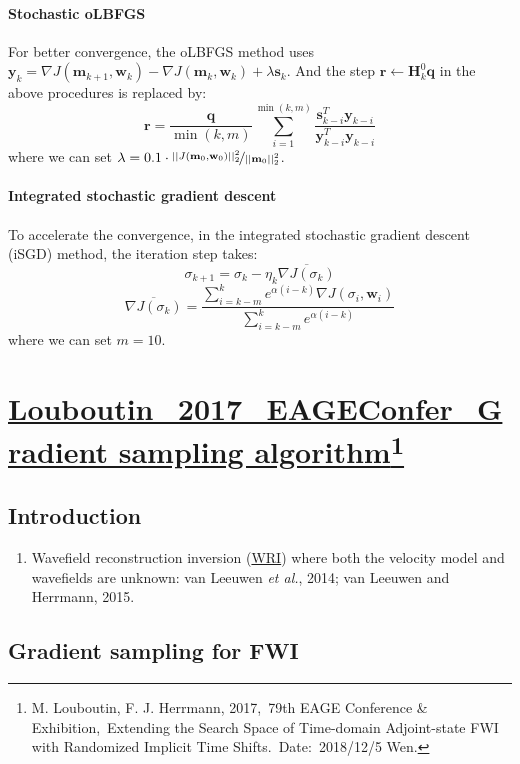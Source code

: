 \documentclass{article}
\newcommand{\Ppath}{/home/tche/Learning/Learning/Paper/}
\newcommand{\prf}{This is relative path from \Papth to the paper file}
\newcommand{\pmk}{This is the brief info.}
\newcommand{\pti}{This is the paper tile}
\newcommand{\pay}{These are authors and year}
\newcommand{\pjo}{This is the journal}
\newcommand{\pda}{This is the date}
\newcommand{\refp}[1]{\href{run:\Ppath\prf}{#1}}
\newcommand{\pinfo}{\refp{\pmk}\footnote{\pay,~\pjo,~\pti.~Date:~\pda}}
\newcommand{\mbf}[1]{\mathbf{#1}}
\newcommand{\myem}[1]{{\color{red}\uline{#1}}}
\newcommand{\etal}{\textit{et al.}}
\begin{document}
\paragraph{Stochastic oLBFGS}
For better convergence, the oLBFGS method uses $\mbf y_k=\nabla J(\mbf m_{k+1},\mbf w_k)-\nabla J(\mbf m_k,\mbf w_k)+\lambda\mbf s_k$. And the step $\mbf r\leftarrow\mbf H_k^0\mbf q$ in the above procedures is replaced by:
\[ \mbf r=\frac{\mbf q}{\min(k,m)}\sum_{i=1}^{\min(k,m)}\frac{\mbf s_{k-i}^T\mbf y_{k-i}}{\mbf y_{k-i}^T\mbf y_{k-i}} \]
where we can set $\lambda=0.1\cdot\nicefrac{||J(\mbf m_0,\mbf w_0)||_2^2}{||\mbf m_0||_2^2}$.\par
\paragraph{Integrated stochastic gradient descent}
To accelerate the convergence, in the integrated stochastic gradient descent (iSGD) method, the iteration step takes:
\[ \sigma_{k+1}=\sigma_k-\eta_k\overline{\nabla J(\sigma_k)} \]
\[ \overline{\nabla J(\sigma_k)}=\frac{\sum_{i=k-m}^ke^{\alpha(i-k)}\nabla J(\sigma_i,\mbf w_i)}{\sum_{i=k-m}^ke^{\alpha(i-k)}} \]
where we can set $m=10$.\par
\vspace{5mm}

\renewcommand{\pmk}{Louboutin\_2017\_EAGEConfer\_Gradient sampling algorithm}
\renewcommand{\prf}{FWI/\pmk.pdf}
\renewcommand{\pti}{Extending the Search Space of Time-domain Adjoint-state FWI with Randomized Implicit Time Shifts}
\renewcommand{\pay}{M. Louboutin, F. J. Herrmann, 2017}
\renewcommand{\pjo}{79th EAGE Conference \& Exhibition}
\renewcommand{\pda}{2018/12/5 Wen.}
\section{\pinfo}
\subsection{Introduction}
\begin{enumerate}[\hspace{10mm}*]
  \item Wavefield reconstruction inversion (\myem{WRI}) where both the velocity model and wavefields are unknown: van Leeuwen \etal, 2014; van Leeuwen and Herrmann, 2015.
\end{enumerate}\par
\subsection{Gradient sampling for FWI}
\end{document}
